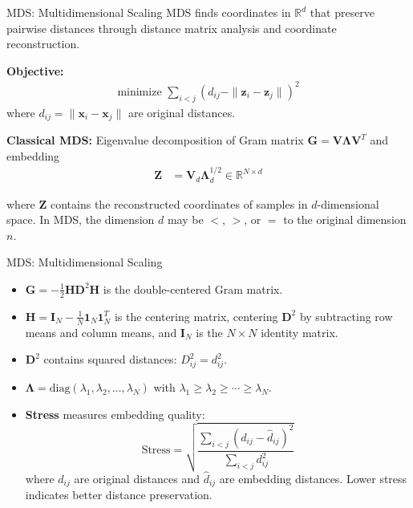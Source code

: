 \documentclass{beamer}
\begin{document}
\begin{frame}{MDS: Multidimensional Scaling}
  MDS finds coordinates in $\mathbb{R}^d$ that \alert{preserve pairwise distances} through distance matrix analysis and coordinate reconstruction.
  
  \vspace{0.3cm}
  \textbf{Objective:}
  \begin{align*}
    \text{minimize } \sum_{i<j} (d_{ij} - \|\mathbf{z}_i - \mathbf{z}_j\|)^2
  \end{align*}
  where $d_{ij} = \|\mathbf{x}_i - \mathbf{x}_j\|$ are original distances.
  
  \vspace{0.3cm}
  \textbf{Classical MDS:} Eigenvalue decomposition of Gram matrix
  $\mathbf{G}=\mathbf{V}\boldsymbol{\Lambda}\mathbf{V}^T$ and embedding
  \begin{align*}
    \mathbf{Z} &= \mathbf{V}_d\boldsymbol{\Lambda}_d^{1/2} \in \mathbb{R}^{N \times d}
  \end{align*}
  
  where $\mathbf{Z}$ contains the reconstructed coordinates of samples in $d$-dimensional space.\pause
  \alert{In MDS, the dimension $d$ may be $<$, $>$, or $=$ to the original dimension $n$.}
\end{frame}
\begin{frame}{MDS: Multidimensional Scaling}
  \begin{itemize}
  \item $\mathbf{G} = -\frac{1}{2}\mathbf{H}\mathbf{D}^2\mathbf{H}$ is the double-centered Gram matrix.
    \vspace{0.5cm}    
  \item $\mathbf{H} = \mathbf{I}_N - \frac{1}{N}\mathbf{1}_N\mathbf{1}_N^T$ is the centering matrix, centering $\mathbf{D}^2$ by subtracting row means and column means, and $\mathbf{I}_N$ is the $N \times N$ identity matrix.
    \vspace{0.5cm}        
  \item $\mathbf{D}^2$ contains squared distances: $D^2_{ij} = d_{ij}^2$.
    \vspace{0.5cm}    
  \item $\boldsymbol{\Lambda} = \text{diag}(\lambda_1, \lambda_2, \ldots, \lambda_N)$ with $\lambda_1 \geq \lambda_2 \geq \cdots \geq \lambda_N$.
    \vspace{0.5cm}
  \item \textbf{Stress} measures embedding quality:
    $$\text{Stress} = \sqrt{\frac{\sum_{i<j} (d_{ij} - \hat{d}_{ij})^2}{\sum_{i<j} d_{ij}^2}}$$
    where $d_{ij}$ are original distances and $\hat{d}_{ij}$ are embedding distances.
    \vspace{0.3cm}
    \alert{Lower stress indicates better distance preservation.}
  \end{itemize}
\end{frame}
\end{document}
